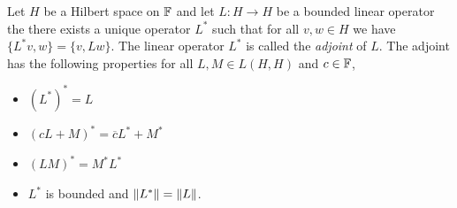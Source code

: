 \begin{prop}\label{hilbert:BoundedAdjoints} Let $H$ be a Hilbert space
  on $\mathbb{F}$ and let $L : H \to H$ be a bounded linear operator the
  there exists a unique operator $L^*$ such that for all $v,w \in H$
  we have $\lbrace L^* v, w \rbrace = \lbrace v, L w \rbrace$.   The
  linear operator $L^*$ is called the \emph{adjoint} of $L$.   The
  adjoint has the following properties for all $L,M \in L(H,H)$ and $c \in \mathbb{F}$,
  \begin{itemize}
  \item[(i)] $\left(L^*\right)^* = L$
  \item[(ii)] $\left(cL + M\right)^* = \overline{c}L^* + M^*$
  \item[(iii)] $\left(LM\right)^* = M^* L^*$
  \item[(iv)] $L^*$ is bounded and $\left \lVert L^* \right \rVert = \left \lVert L \right \rVert$.
  \end{itemize}
\end{prop}
